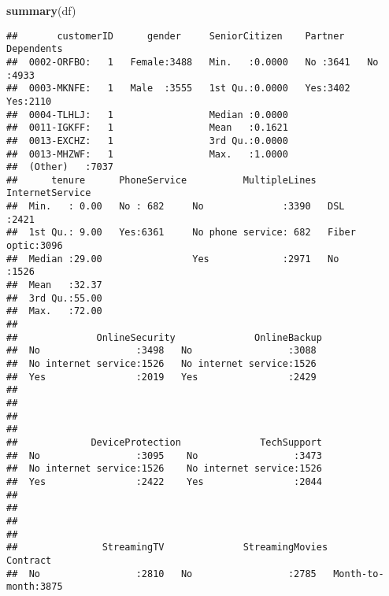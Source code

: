 \documentclass[
]{article}
\newenvironment{Shaded}{\begin{snugshade}}{\end{snugshade}}
\newcommand{\FunctionTok}[1]{\textcolor[rgb]{0.13,0.29,0.53}{\textbf{#1}}}
\newcommand{\NormalTok}[1]{#1}
\begin{document}
\begin{Shaded}
\begin{Highlighting}[]
\FunctionTok{summary}\NormalTok{(df)}
\end{Highlighting}
\end{Shaded}

\begin{verbatim}
##       customerID      gender     SeniorCitizen    Partner    Dependents
##  0002-ORFBO:   1   Female:3488   Min.   :0.0000   No :3641   No :4933  
##  0003-MKNFE:   1   Male  :3555   1st Qu.:0.0000   Yes:3402   Yes:2110  
##  0004-TLHLJ:   1                 Median :0.0000                        
##  0011-IGKFF:   1                 Mean   :0.1621                        
##  0013-EXCHZ:   1                 3rd Qu.:0.0000                        
##  0013-MHZWF:   1                 Max.   :1.0000                        
##  (Other)   :7037                                                       
##      tenure      PhoneService          MultipleLines     InternetService
##  Min.   : 0.00   No : 682     No              :3390   DSL        :2421  
##  1st Qu.: 9.00   Yes:6361     No phone service: 682   Fiber optic:3096  
##  Median :29.00                Yes             :2971   No         :1526  
##  Mean   :32.37                                                          
##  3rd Qu.:55.00                                                          
##  Max.   :72.00                                                          
##                                                                         
##              OnlineSecurity              OnlineBackup 
##  No                 :3498   No                 :3088  
##  No internet service:1526   No internet service:1526  
##  Yes                :2019   Yes                :2429  
##                                                       
##                                                       
##                                                       
##                                                       
##             DeviceProtection              TechSupport  
##  No                 :3095    No                 :3473  
##  No internet service:1526    No internet service:1526  
##  Yes                :2422    Yes                :2044  
##                                                        
##                                                        
##                                                        
##                                                        
##               StreamingTV              StreamingMovies           Contract   
##  No                 :2810   No                 :2785   Month-to-month:3875  

\end{verbatim}
\end{document}
